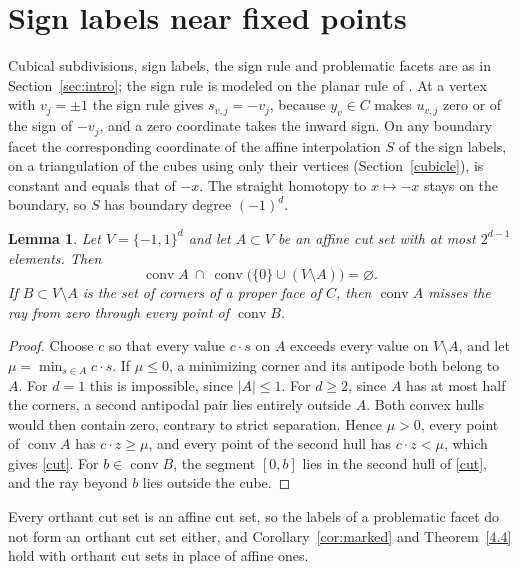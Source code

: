 \documentclass[11pt]{amsart}
\newtheorem{lem}[thm]{Lemma}
\theoremstyle{definition}
\theoremstyle{remark}
\numberwithin{equation}{section}
\DeclareMathOperator{\conv}{conv}
\begin{document}
\section{Sign labels near fixed points}\label{sec:sign}
Cubical subdivisions, sign labels, the sign rule and problematic facets are as in Section~\ref{sec:intro}; the sign rule is modeled on the planar rule of \cite[\S4]{GS1}. At a vertex with $v_j=\pm1$ the sign rule gives $s_{v,j}=-v_j$, because $y_v\in C$ makes $u_{v,j}$ zero or of the sign of $-v_j$, and a zero coordinate takes the inward sign. On any boundary facet the corresponding coordinate of the affine interpolation $S$ of the sign labels, on a triangulation of the cubes using only their vertices (Section~\ref{cubicle}), is constant and equals that of $-x$. The straight homotopy to $x\mapsto-x$ stays on the boundary, so $S$ has boundary degree $(-1)^d$.

\begin{lem}\label{lem:cut}
Let $V=\{-1,1\}^d$ and let $A\subset V$ be an affine cut set with at most $2^{d-1}$ elements. Then
\begin{equation}\label{cut}
           \conv A\ \cap\ \conv\bigl(\{0\}\cup(V\setminus A)\bigr)=\varnothing .
\end{equation}
If $B\subset V\setminus A$ is the set of corners of a proper face of $C$, then $\conv A$ misses the ray from zero through every point of $\conv B$.
\end{lem}

\begin{proof}
Choose $c$ so that every value $c\cdot s$ on $A$ exceeds every value on $V\setminus A$, and let $\mu=\min_{s\in A}c\cdot s$. If $\mu\le0$, a minimizing corner and its antipode both belong to $A$. For $d=1$ this is impossible, since $|A|\le1$. For $d\ge2$, since $A$ has at most half the corners, a second antipodal pair lies entirely outside $A$. Both convex hulls would then contain zero, contrary to strict separation. Hence $\mu>0$, every point of $\conv A$ has $c\cdot z\ge\mu$, and every point of the second hull has $c\cdot z<\mu$, which gives \eqref{cut}. For $b\in\conv B$, the segment $[0,b]$ lies in the second hull of \eqref{cut}, and the ray beyond $b$ lies outside the cube.
\end{proof}

Every orthant cut set is an affine cut set, so the labels of a problematic facet do not form an orthant cut set either, and Corollary~\ref{cor:marked} and Theorem~\ref{4.4} hold with orthant cut sets in place of affine ones.
\end{document}
